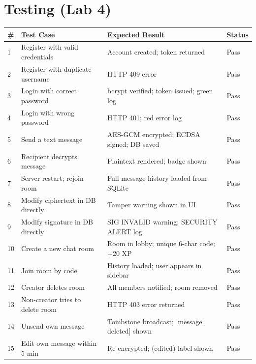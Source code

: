 \documentclass[12pt, a4paper]{article}
\begin{document}
\section{Testing (Lab 4)}

\begin{longtable}{p{0.5cm} p{5.2cm} p{4.5cm} p{2.5cm}}
    \toprule
    \textbf{\#} & \textbf{Test Case} & \textbf{Expected Result} & \textbf{Status} \\
    \midrule
    \endhead
    1  & Register with valid credentials & Account created; token returned & Pass \\
    \midrule
    2  & Register with duplicate username & HTTP 409 error & Pass \\
    \midrule
    3  & Login with correct password & bcrypt verified; token issued; green log & Pass \\
    \midrule
    4  & Login with wrong password & HTTP 401; red error log & Pass \\
    \midrule
    5  & Send a text message & AES-GCM encrypted; ECDSA signed; DB saved & Pass \\
    \midrule
    6  & Recipient decrypts message & Plaintext rendered; badge shown & Pass \\
    \midrule
    7  & Server restart; rejoin room & Full message history loaded from SQLite & Pass \\
    \midrule
    8  & Modify ciphertext in DB directly & Tamper warning shown in UI & Pass \\
    \midrule
    9  & Modify signature in DB directly & SIG INVALID warning; SECURITY ALERT log & Pass \\
    \midrule
    10 & Create a new chat room & Room in lobby; unique 6-char code; +20 XP & Pass \\
    \midrule
    11 & Join room by code & History loaded; user appears in sidebar & Pass \\
    \midrule
    12 & Creator deletes room & All members notified; room removed & Pass \\
    \midrule
    13 & Non-creator tries to delete room & HTTP 403 error returned & Pass \\
    \midrule
    14 & Unsend own message & Tombstone broadcast; [message deleted] shown & Pass \\
    \midrule
    15 & Edit own message within 5 min & Re-encrypted; (edited) label shown & Pass \\

\end{longtable}
\end{document}
